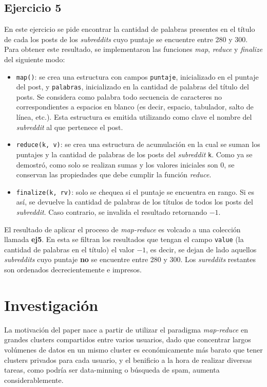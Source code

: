 \documentclass[a4paper]{article}
\begin{document}
\subsection{Ejercicio 5}
En este ejercicio se pide encontrar la cantidad de palabras presentes en el
título de cada los posts de los \textit{subreddits} cuyo puntaje se encuentre
entre 280 y 300. Para obtener este resultado, se implementaron las funciones
\textit{map}, \textit{reduce} y \textit{finalize} del siguiente modo:
\begin{itemize}
  \item \verb|map()|: se crea una estructura con campos \verb|puntaje|,
  inicializado en el puntaje del post, y \verb|palabras|, inicializado en la
  cantidad de palabras del título del posts. Se considera como palabra todo
  secuencia de caracteres no correspondientes a espacios en blanco (es decir,
  espacio, tabulador, salto de línea, etc.). Esta estructura es emitida
  utilizando como clave el nombre del \textit{subreddit} al que pertenece el
  post.
  \item \verb|reduce(k, v)|: se crea una estructura de acumulación en la cual
  se suman los puntajes y la cantidad de palabras de los posts del
  \textit{subreddit} \verb|k|. Como ya se demostró, como solo se realizan sumas
  y los valores iniciales son $0$, se conservan las propiedades que debe
  cumplir la función \textit{reduce}.
  \item \verb|finalize(k, rv)|: solo se chequea si el puntaje se encuentra en
  rango. Si es así, se devuelve la cantidad de palabras de los títulos de todos
  los posts del \textit{subreddit}. Caso contrario, se invalida el resultado
  retornando $-1$.
\end{itemize}

El resultado de aplicar el proceso de \textit{map-reduce} es volcado a una
colección llamada \textbf{ej5}. En esta se filtran los resultados que tengan el
campo \verb|value| (la cantidad de palabras en el título) el valor $-1$, es
decir, se dejan de lado aquellos \textit{subreddits} cuyo puntaje \textbf{no}
se encuentre entre 280 y 300. Los \textit{sureddits} restantes son ordenados
decrecientemente e impresos.

\newpage
\section{Investigación}

La motivación del paper nace a partir de utilizar el paradigma
\textit{map-reduce} en grandes clusters compartidos entre varios usuarios, dado
que concentrar largos volúmenes de datos en un mismo cluster es económicamente
más barato que tener clusters privados para cada usuario, y el benificio a la
hora de realizar diversas tareas, como podría ser data-minning o búsqueda de
spam, aumenta considerablemente.
\end{document}
